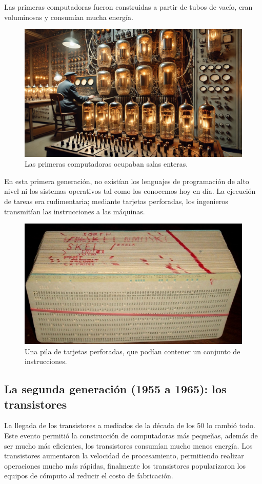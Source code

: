Las primeras computadoras fueron construidas a partir de tubos de vacío, eran voluminosas y consumían mucha energía.
\begin{figure}[H]
	\centering
	\includegraphics[width=0.5\linewidth]{Imagenes/tubos.png}
	\caption{Las primeras computadoras ocupaban salas enteras.}
	\label{fig:enter-label}
\end{figure}
En esta primera generación, no existían los lenguajes de programación de alto nivel ni los sistemas operativos tal como los conocemos hoy en día. La ejecución de tareas era rudimentaria; mediante tarjetas perforadas, los ingenieros transmitían las instrucciones a las máquinas.
\begin{figure}[H]
	\centering
	\includegraphics[width=0.6\linewidth]{Imagenes/tarjetas.png}
	\caption{Una pila de tarjetas perforadas, que podían contener un conjunto de instrucciones.}
	\label{fig:enter-label}
\end{figure}

\subsection{La segunda generación (1955 a 1965): los transistores}

La llegada de los transistores a mediados de la década de los 50 lo cambió todo. Este evento permitió la construcción de computadoras más pequeñas, además de ser mucho más eficientes, los transistores consumían mucho menos energía. Los transistores aumentaron la velocidad de procesamiento, permitiendo realizar operaciones mucho más rápidas, finalmente los transistores popularizaron los equipos de cómputo al reducir el costo de fabricación.


